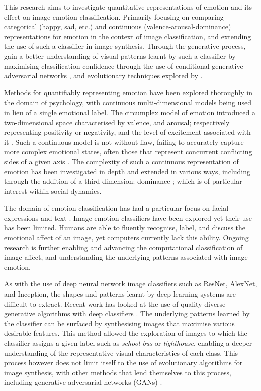 \documentclass{article}
\begin{document}
This research aims to investigate quantitative representations of emotion and its effect on image emotion classification.
Primarily focusing on comparing categorical (happy, sad, etc.) and continuous (valence-arousal-dominance) representations for emotion in the context of image classification, and extending the use of such a classifier in image synthesis.
Through the generative process, gain a better understanding of visual patterns learnt by such a classifier by maximising classification confidence through the use of conditional generative adversarial networks \citep{gauthier2014conditional}, and evolutionary techniques explored by \citep{nguyen2015deep}.

Methods for quantifiably representing emotion have been explored thoroughly in the domain of psychology, with continuous multi-dimensional models being used in lieu of a single emotional label.
The circumplex model of emotion introduced a two-dimensional space characterised by valence, and arousal; respectively representing positivity or negativity, and the level of excitement associated with it \citep{russell1980circumplex}.
Such a continuous model is not without flaw, failing to accurately capture more complex emotional states, often those that represent concurrent conflicting sides of a given axis \citep{larsen1992promises}.
The complexity of such a continuous representation of emotion has been investigated in depth and extended in various ways, including through the addition of a third dimension: dominance \citep{bradley1994measuring}; which is of particular interest within social dynamics.

The domain of emotion classification has had a particular focus on facial expressions and text \citep{cambria2016affective, warriner2013norms}.
Image emotion classifiers have been explored \citep{kim2018building, machajdik2010affective, chen2015learning, chen2014deepsentibank} yet their use has been limited.
Humans are able to fluently recognise, label, and discuss the emotional affect of an image, yet computers currently lack this ability.
Ongoing research is further enabling and advancing the computational classification of image affect, and understanding the underlying patterns associated with image emotion.

As with the use of deep neural network image classifiers such as ResNet, AlexNet, and Inception, the shapes and patterns learnt by deep learning systems are difficult to extract.
Recent work has looked at the use of quality-diverse generative algorithms with deep classifiers \citep{nguyen2015deep, nguyen2015innovation}.
The underlying patterns learned by the classifier can be surfaced by synthesising images that maximise various desirable features.
This method allowed the exploration of images to which the classifier assigns a given label such as \textit{school bus} or \textit{lighthouse}, enabling a deeper understanding of the representative visual characteristics of each class.
This process however does not limit itself to the use of evolutionary algorithms for image synthesis, with other methods that lend themselves to this process, including generative adversarial networks (GANs) \citep{GAN}.
\end{document}
